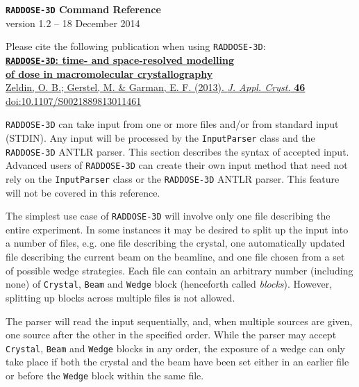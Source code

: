 \documentclass[a4paper]{article}
\newcommand{\RD}{\texttt{RADDOSE-3D}\xspace}
\newcommand{\Class}[1]{\texttt{#1}\xspace}
\begin{document}
\begin{center}
\noindent \textsf{\huge\textbf{\RD Command Reference}}\\[0.3em]
version 1.2 -- 18 December 2014\\[3.5em]
\end{center}

\noindent
Please cite the following publication when using \RD:\\[0.4em]
\href{http://dx.doi.org/10.1107/S0021889813011461}{\large\textbf{\RD: time- and space-resolved modelling\\[0.0em] of dose in macromolecular crystallography}}\\[0.1em]
\href{http://dx.doi.org/10.1107/S0021889813011461}{Zeldin, O. B.; Gerstel, M. \& Garman, E. F. (2013). \textit{J. Appl. Cryst.} \textbf{46} %
}\\[0.1em]
\href{http://dx.doi.org/10.1107/S0021889813011461}{doi:10.1107/S0021889813011461}
\\[1.5em]
\tableofcontents


\newpage

\RD can take input from one or more files and/or from standard input (STDIN).
Any input will be processed by the \Class{InputParser} class and the \RD ANTLR parser.
This section describes the syntax of accepted input.
Advanced users of \RD can create their own input method that need not rely on the \Class{InputParser} class or the \RD ANTLR parser. This feature will not be covered in this reference.

The simplest use case of \RD will involve only one file describing the entire experiment.
In some instances it may be desired to split up the input into a number of files, e.g. one file describing the crystal, one automatically updated file describing the current beam on the beamline, and one file chosen from a set of possible wedge strategies.
Each file can contain an arbitrary number (including none) of \Class{Crystal}, \Class{Beam} and \Class{Wedge} block (henceforth called \textit{blocks}). However, splitting up blocks across multiple files is not allowed.

The parser will read the input sequentially, and, when multiple sources are given, one source after the other in the specified order. While the parser may accept \Class{Crystal}, \Class{Beam} and \Class{Wedge} blocks in any order, the exposure of a wedge can only take place if both the crystal and the beam have been set either in an earlier file or before the \Class{Wedge} block within the same file.
\end{document}

